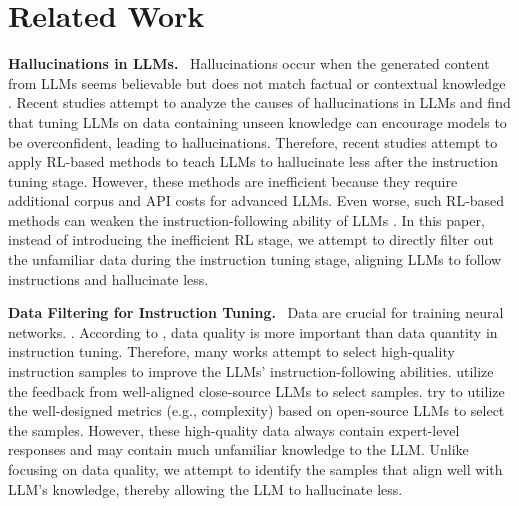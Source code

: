 \section{Related Work}

\textbf{Hallucinations in LLMs.}
\
Hallucinations occur when the generated content from LLMs seems believable but does not match factual or contextual knowledge \citep{ji-survey, rawte2023surveyhallucinationlargefoundation, hit-survey}.
Recent studies \citep{lin2024flame, kang2024unfamiliarfinetuningexamplescontrol, gekhman-etal-2024-fine} attempt to analyze the causes of hallucinations in LLMs and find that tuning LLMs on data containing unseen knowledge can encourage models to be overconfident, leading to hallucinations.
Therefore, recent studies \citep{lin2024flame, zhang-etal-2024-self, tian2024finetuning} attempt to apply RL-based methods to teach LLMs to hallucinate less after the instruction tuning stage.
However, these methods are inefficient because they require additional corpus and API costs for advanced LLMs.
Even worse, such RL-based methods can weaken the instruction-following ability of LLMs \citep{lin2024flame}.
In this paper, instead of introducing the inefficient RL stage, we attempt to directly filter out the unfamiliar data during the instruction tuning stage, aligning LLMs to follow instructions and hallucinate less.






\noindent
\textbf{Data Filtering for Instruction Tuning.}
\
Data are crucial for training neural networks. \citep{van2020survey, song2022learningnoisylabelsdeep, si-etal-2022-scl, si-etal-2023-santa, zhao2024ultraedit, an2024threadlogicbaseddataorganization, si-etal-2024-improving, cai-etal-2024-unipcm}.
According to \citet{zhou2023lima}, data quality is more important than data quantity in instruction tuning.
Therefore, many works attempt to select high-quality instruction samples to improve the LLMs’ instruction-following abilities.
\citet{chen2023alpagasus, liu2024what} utilize the feedback from well-aligned close-source LLMs to select samples.
\citet{cao2024instructionmininginstructiondata,li-etal-2024-quantity, ge2024clustering, si2024selecting, xia2024less,zhang2024recostexternalknowledgeguided} try to utilize the well-designed metrics (e.g., complexity) based on open-source LLMs to select the samples.
However, these high-quality data always contain expert-level responses and may contain much unfamiliar knowledge to the LLM.
Unlike focusing on data quality, we attempt to identify the samples that align well with LLM's knowledge, thereby allowing the LLM to hallucinate less.
